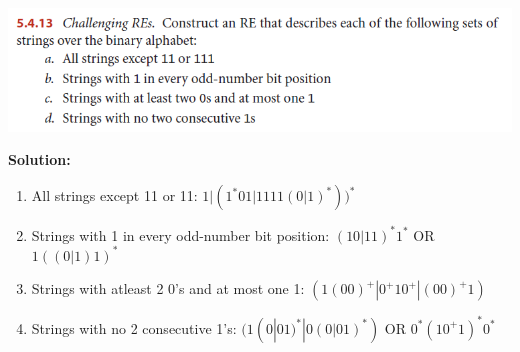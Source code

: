 \documentclass[11pt,fleqn]{article}
\newcommand{\be}{\begin{enumerate}}
\newcommand{\ee}{\end{enumerate}}
\begin{document}
\begin{center}
\includegraphics[scale=.8]{5.4.13.png}
\end{center}

\textbf{Solution:}

\be
	\item All strings except 11 or 11: $1|(1^*01|1111(0|1)^*))^*$
	\item Strings with 1 in every odd-number bit position: $(10|11)^*1^*$ OR $1((0|1)1)^*$
	\item Strings with atleast 2 0's and at most one 1: $(1(00)^+|0^+10^+|(00)^+1)$
		\item Strings with no 2 consecutive 1's: $(1(0|01)^*|0(0|01)^*)$ OR $0^*(10^+1)^*0^*$
	
\ee
\end{document}
